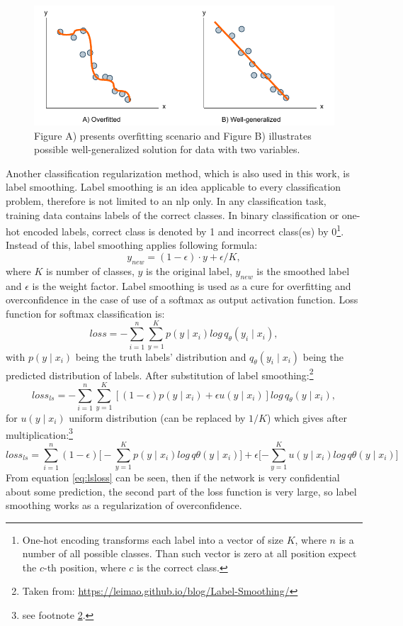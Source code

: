 \begin{figure}[H]
\centering
\includegraphics[width=1\columnwidth]{../img/overfitting}
\caption[Overfitting]{Figure A) presents overfitting scenario and Figure B) illustrates possible well-generalized solution for data with two variables. }
\label{pic:overfitting}
\end{figure}
Another classification regularization method, which is also used in this work, is label smoothing. Label smoothing \citep{Szegedy2015} is an idea applicable to every classification problem, therefore is not limited to an \acrshort{nlp} only.
In any classification task, training data contains labels of the correct classes. In binary classification or one-hot encoded labels, correct class is denoted by 1 and incorrect class(es) by 0\footnote{One-hot encoding transforms each label into a vector of size $K$, where $n$ is a number of all possible classes. Than such vector is zero at all position expect the $c$-th position, where $c$ is the correct class.}. Instead of this, label smoothing applies following formula: 
$$y_{new} = (1 - \epsilon) \cdot y + \epsilon / K,$$ where $K$ is number of classes, $y$ is the original label, $y_{new}$ is the smoothed label and $\epsilon$ is the weight factor. Label smoothing is used as a cure for overfitting and overconfidence in the case of use of a softmax as output activation function. Loss function for softmax classification is: 
 $$ loss = -\sum_{i=1}^{n} \sum_{y=1}^{K} p(y \mid x_i) log \, q_{\theta} ( y_i \mid x_i ),$$
with $p(y \mid x_i)$ being the truth labels' distribution and $q_{\theta} ( y_i \mid x_i )$ being the predicted distribution of labels. After substitution of label smoothing:\footnote{\label{note1} Taken from: \url{https://leimao.github.io/blog/Label-Smoothing/}}
$$
loss_{ls} = -\sum_{i=1}^{n} \sum_{y=1}^{K} [(1-\epsilon) p(y \mid x_i)+\epsilon u(y\mid x_i)]log \, q_\theta(y \mid x_i), $$
for $u(y\mid x_i)$ uniform distribution (can be replaced by $1/K$)
which gives after multiplication:\footnote{see footnote \ref{note1}.}
 \begin{equation} \label{eq:lsloss}
 loss_{ls}= \sum_{i=1}^{n} {(1- \epsilon)\bigg[- \sum_{y=1}^{K} p(y\mid x_i) log \, q\theta(y \mid x_i)]+\epsilon [- \sum_{y=1}^{K} u(y \mid x_i)log \, q\theta (y\mid x_i)\bigg]}
 \end{equation}
From equation \ref{eq:lsloss} can be seen, then if the network is very confidential about some prediction, the second part of the loss function is very large, so label smoothing works as a regularization of overconfidence.

